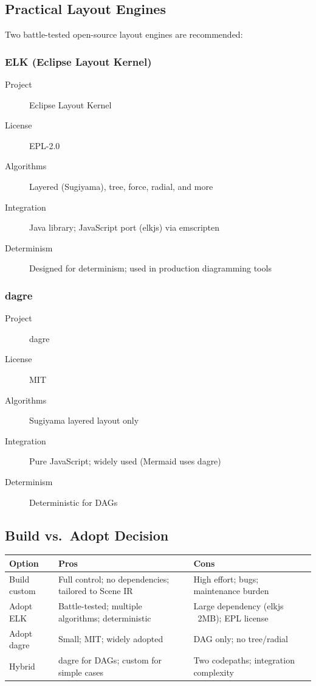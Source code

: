\subsection{Practical Layout Engines}

Two battle-tested open-source layout engines are recommended:

\subsubsection{ELK (Eclipse Layout Kernel)}
\label{sec:elk}

\begin{description}
  \item[Project] Eclipse Layout Kernel~\cite{elk}
  \item[License] EPL-2.0
  \item[Algorithms] Layered (Sugiyama), tree, force, radial, and more
  \item[Integration] Java library; JavaScript port (elkjs) via emscripten
  \item[Determinism] Designed for determinism; used in production diagramming tools
\end{description}

\subsubsection{dagre}
\label{sec:dagre}

\begin{description}
  \item[Project] dagre~\cite{dagre}
  \item[License] MIT
  \item[Algorithms] Sugiyama layered layout only
  \item[Integration] Pure JavaScript; widely used (Mermaid uses dagre)
  \item[Determinism] Deterministic for DAGs
\end{description}

\subsection{Build vs.\ Adopt Decision}

\begin{center}
\small
\begin{tabular}{lp{5cm}p{5cm}}
\toprule
\textbf{Option} & \textbf{Pros} & \textbf{Cons} \\
\midrule
Build custom & Full control; no dependencies; tailored to Scene IR & High effort; bugs; maintenance burden \\
Adopt ELK & Battle-tested; multiple algorithms; deterministic & Large dependency (elkjs ~2MB); EPL license \\
Adopt dagre & Small; MIT; widely adopted & DAG only; no tree/radial \\
Hybrid & dagre for DAGs; custom for simple cases & Two codepaths; integration complexity \\
\bottomrule
\end{tabular}
\end{center}

